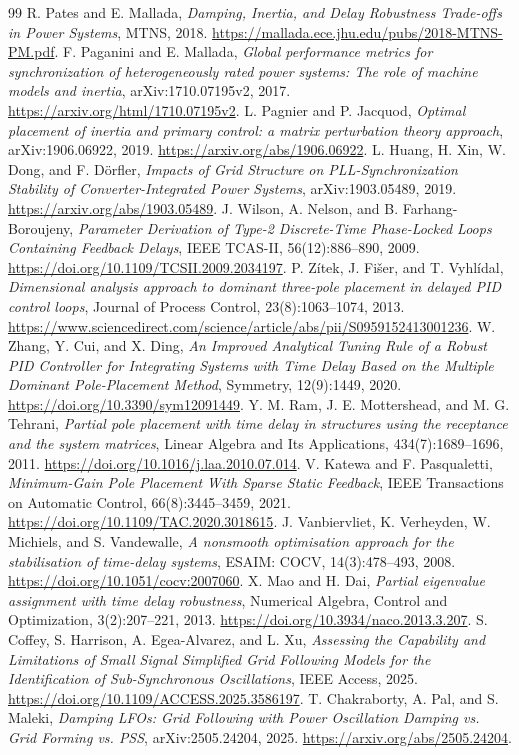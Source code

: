\documentclass[11pt]{article}
\begin{document}
\begin{thebibliography}{99}
 R. Pates and E. Mallada,
\emph{Damping, Inertia, and Delay Robustness Trade-offs in Power Systems},
MTNS, 2018.
\url{https://mallada.ece.jhu.edu/pubs/2018-MTNS-PM.pdf}.
 F. Paganini and E. Mallada,
\emph{Global performance metrics for synchronization of heterogeneously
rated power systems: The role of machine models and inertia},
arXiv:1710.07195v2, 2017.
\url{https://arxiv.org/html/1710.07195v2}.
 L. Pagnier and P. Jacquod,
\emph{Optimal placement of inertia and primary control: a matrix
perturbation theory approach}, arXiv:1906.06922, 2019.
\url{https://arxiv.org/abs/1906.06922}.
 L. Huang, H. Xin, W. Dong, and F. D\"orfler,
\emph{Impacts of Grid Structure on PLL-Synchronization Stability of
Converter-Integrated Power Systems}, arXiv:1903.05489, 2019.
\url{https://arxiv.org/abs/1903.05489}.
 J. Wilson, A. Nelson, and B. Farhang-Boroujeny,
\emph{Parameter Derivation of Type-2 Discrete-Time Phase-Locked Loops
Containing Feedback Delays}, IEEE TCAS-II, 56(12):886--890, 2009.
\url{https://doi.org/10.1109/TCSII.2009.2034197}.
 P. Z\'itek, J. Fi\v{s}er, and T. Vyhl\'idal,
\emph{Dimensional analysis approach to dominant three-pole placement
in delayed PID control loops}, Journal of Process Control,
23(8):1063--1074, 2013.
\url{https://www.sciencedirect.com/science/article/abs/pii/S0959152413001236}.
 W. Zhang, Y. Cui, and X. Ding,
\emph{An Improved Analytical Tuning Rule of a Robust PID Controller
for Integrating Systems with Time Delay Based on the Multiple
Dominant Pole-Placement Method}, Symmetry, 12(9):1449, 2020.
\url{https://doi.org/10.3390/sym12091449}.
 Y. M. Ram, J. E. Mottershead, and M. G. Tehrani,
\emph{Partial pole placement with time delay in structures using the
receptance and the system matrices}, Linear Algebra and Its Applications,
434(7):1689--1696, 2011.
\url{https://doi.org/10.1016/j.laa.2010.07.014}.
 V. Katewa and F. Pasqualetti,
\emph{Minimum-Gain Pole Placement With Sparse Static Feedback},
IEEE Transactions on Automatic Control, 66(8):3445--3459, 2021.
\url{https://doi.org/10.1109/TAC.2020.3018615}.
 J. Vanbiervliet, K. Verheyden, W. Michiels,
and S. Vandewalle, \emph{A nonsmooth optimisation approach for the
stabilisation of time-delay systems}, ESAIM: COCV, 14(3):478--493, 2008.
\url{https://doi.org/10.1051/cocv:2007060}.
 X. Mao and H. Dai,
\emph{Partial eigenvalue assignment with time delay robustness},
Numerical Algebra, Control and Optimization, 3(2):207--221, 2013.
\url{https://doi.org/10.3934/naco.2013.3.207}.
 S. Coffey, S. Harrison, A. Egea-Alvarez, and L. Xu,
\emph{Assessing the Capability and Limitations of Small Signal
Simplified Grid Following Models for the Identification of
Sub-Synchronous Oscillations}, IEEE Access, 2025.
\url{https://doi.org/10.1109/ACCESS.2025.3586197}.
 T. Chakraborty, A. Pal, and S. Maleki,
\emph{Damping LFOs: Grid Following with Power Oscillation Damping
vs. Grid Forming vs. PSS}, arXiv:2505.24204, 2025.
\url{https://arxiv.org/abs/2505.24204}.
\end{thebibliography}
\end{document}
